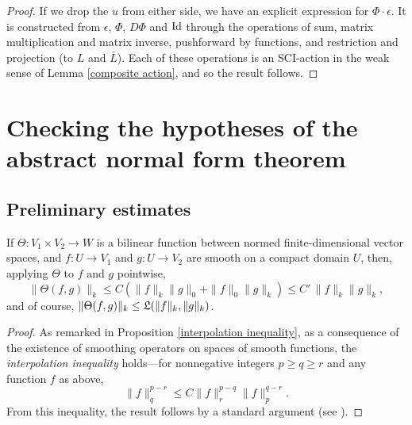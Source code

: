 \documentclass{article}
\begin{document}
\begin{proof}
If we drop the $u$ from either side, we have an explicit expression for $\Phi\cdot\epsilon$.  It is constructed from $\epsilon$, $\Phi$, $D\Phi$ and $\textrm{Id}$ through the operations of sum, matrix multiplication and matrix inverse, pushforward by functions, and restriction and projection (to $L$ and $\bar{L}$).  Each of these operations is an SCI-action in the weak sense of Lemma \ref{composite action}, and so the result follows.
\end{proof}

\section{Checking the hypotheses of the abstract normal form theorem}\label{verifying hypotheses}

\subsection{Preliminary estimates}


\begin{lem}\label{bilinear estimate}
If $\Theta : V_1 \times V_2 \to W$ is a bilinear function between normed finite-dimensional vector spaces, and $f : U \to V_1$ and $g : U \to V_2$ are smooth on a compact domain $U$, then, applying $\Theta$ to $f$ and $g$ pointwise,
$$\|\Theta(f,g)\|_k \leq C (\|f\|_k \|g\|_0 + \|f\|_0 \|g\|_k) \leq C'\, \|f\|_k \|g\|_k,$$
and of course, $\|\Theta(f,g)\|_k \leq \mathfrak{L}(\|f\|_k,\|g\|_k)$.
\end{lem}
\begin{proof}
As remarked in Proposition \ref{interpolation inequality}, as a consequence of the existence of smoothing operators on spaces of smooth functions, the \emph{interpolation inequality} holds---for nonnegative integers $p \geq q \geq r$ and any function $f$ as above,
$$\|f\|_q^{p-r} \leq C \|f\|_r^{p-q} \|f\|_p^{q-r}.$$
From this inequality, the result follows by a standard argument (see \cite[Cor. II.2.2.3]{Hamilton}). 
\end{proof}
\end{document}
